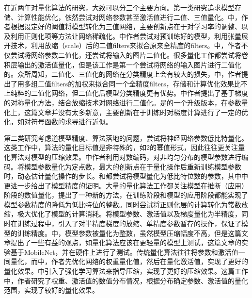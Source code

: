\documentclass[ pdftex, oneside, master]{NJUthesis}
\begin{document}
在近两年对量化算法的研究，大致可以分三个主要方向。第一类研究追求模型存储、计算性能优化，依然尝试对网络参数甚至激活值进行二值、三值量化。\cite{icasspq74}中，作者根据设定好的阈值将模型转化为三值网络，主要创新点在于对学习率的调整、以及利用正则化项等方法让网络稀疏化。\cite{cvprq71}中作者尝试对预训练好的模型，利用张量展开技术，利用放缩（scale）后的二值filters来拟合原来全精度的filters。\cite{iccvq71}中，作者不仅尝试将网络参数二值化，还尝试将输入的图片二值化。很多量化工作都尝试将卷积层输出的激活值量化，但是该工作是第一个尝试将网络的输入图片进行二值化的。众所周知，二值化、三值化的网络在分类精度上会有较大的损失，\cite{nipsq71}中，作者提出了用多组二值filters的加权来拟合同一个全精度filters，存储和计算优化效果比不上纯粹的二值化网络，但二值化后模型分类精度更有优势。\cite{cvprq84}中作者提出了基于梯度的对称量化方法，结合放缩技术对网络进行二值化。\cite{eccvq84}是\cite{xnornet}的一个升级版本，在参数量化上，这篇文章并没有太多新意，主要创新在于训练时对梯度计算进行了一定的优化，如对符号函数的求导进行近似。

第二类研究考虑道模型精度、算法落地的问题，尝试将神经网络参数低比特量化。这类工作中，算法的量化目标值是非特殊的，如2的幂值形式，因此往往更关注量化算法对模型的压缩效果。\cite{icasspq71}中作者利用对数编码，对非均匀分布的模型参数进行编码。\cite{icasspq72}将模型参数量化为定点数，最大的创新点在于量化操作后重新训练模型参数时，动态估计量化操作的步长。\cite{icmlq71}和\cite{icmlq72}都尝试将模型量化为低比特位数的参数，其中\cite{icmlq72}中更进一步给出了模型精度的证明。大量的量化算法工作都关注模型在推断（应用）阶段的数值量化，\cite{iclrq81}提出了一种新的方法，在训练阶段和模型的应用阶段都能实现了模型参数精度的降低为低比特位的整数。同时\cite{iclrq81}尝试将正则化层的计算转化为常数放缩，极大优化了模型的计算消耗。\cite{iclrq82}将模型参数、激活值以及梯度量化为半精度，同时在训练过程中，引入了对半精度梯度的放缩、单精度参数暂存的操作，保证了模型的训练精度。\cite{cvprq82}中，模型参数被量化为整数，虽然模型压缩幅度不高，但是这篇文章提出了一些有益的观点，如量化算法应该在更轻量的模型上测试，这篇文章的实验基于MobileNet，并在硬件上进行了测试。传统量化算法往往将参数和激活值一同量化，而\cite{cvprq86}中，作者先优化网络的权重量化值，然后在量化激活值，实现了更好的量化效果。\cite{eccvq81}中引入了强化学习算法来指导压缩，实现了更好的压缩效果。\cite{eccvq86}这篇工作中，作者研究了权重、激活值的数值分布情况，根据分布确定参数、激活值的量化范围，实现了较好的量化效果。
\end{document}

